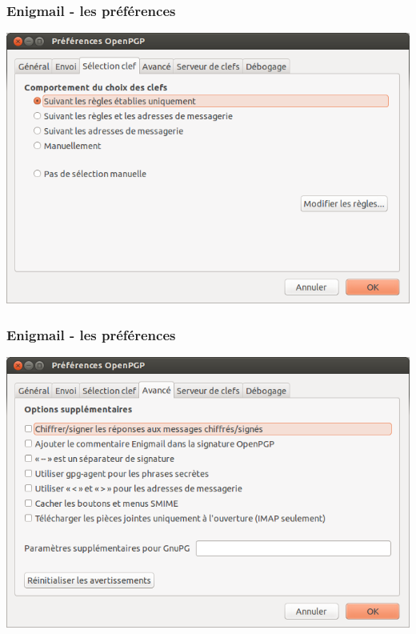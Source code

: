 \documentclass{beamer}
\begin{document}
\begin{frame}
\frametitle{Enigmail - les préférences}
\begin{center}
\includegraphics[scale=0.3] {./images/Enigmail04.png}
\end{center}
\end{frame}


\begin{frame}
\frametitle{Enigmail - les préférences}
\begin{center}
\includegraphics[scale=0.3] {./images/Enigmail05.png}
\end{center}
\end{frame}
\end{document}
